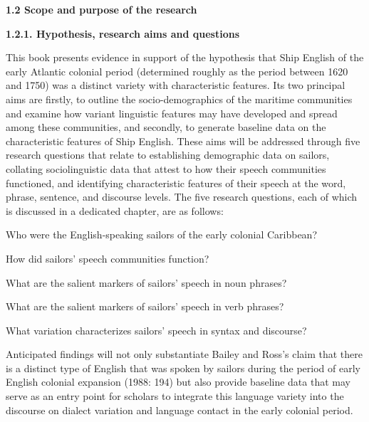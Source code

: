 \begin{styleNormali}
\textbf{1.2 Scope and purpose of the research \ }
\end{styleNormali}

\begin{styleNormali}
\textbf{1.2.1. Hypothesis, research aims and questions}
\end{styleNormali}

\begin{styleNormali}
This book presents evidence in support of the hypothesis that Ship English of the early Atlantic colonial period (determined roughly as the period between 1620 and 1750) was a distinct variety with characteristic features. Its two principal aims are firstly, to outline the socio-demographics of the maritime communities and examine how variant linguistic features may have developed and spread among these communities, and secondly, to generate baseline data on the characteristic features of Ship English. These aims will be addressed through five research questions that relate to establishing demographic data on sailors, collating sociolinguistic data that attest to how their speech communities functioned, and identifying characteristic features of their speech at the word, phrase, sentence, and discourse levels. The five research questions, each of which is discussed in a dedicated chapter, are as follows:
\end{styleNormali}


\setcounter{listWWNumileveli}{0}
\begin{listWWNumileveli}
\item 
\begin{styleNormali}
Who were the English-speaking sailors of the early colonial Caribbean?
\end{styleNormali}
\item 
\begin{styleNormali}
How did sailors’ speech communities function?
\end{styleNormali}
\item 
\begin{styleNormali}
What are the salient markers of sailors’ speech in noun phrases?
\end{styleNormali}
\item 
\begin{styleNormali}
What are the salient markers of sailors’ speech in verb phrases?
\end{styleNormali}
\item 
\begin{styleNormali}
What variation characterizes sailors’ speech in syntax and discourse?
\end{styleNormali}
\end{listWWNumileveli}
\begin{styleNormali}
Anticipated findings will not only substantiate Bailey and Ross’s claim that there is a distinct type of English that was spoken by sailors during the period of early English colonial expansion (1988: 194) but also provide baseline data that may serve as an entry point for scholars to integrate this language variety into the discourse on dialect variation and language contact in the early colonial period. 
\end{styleNormali}


